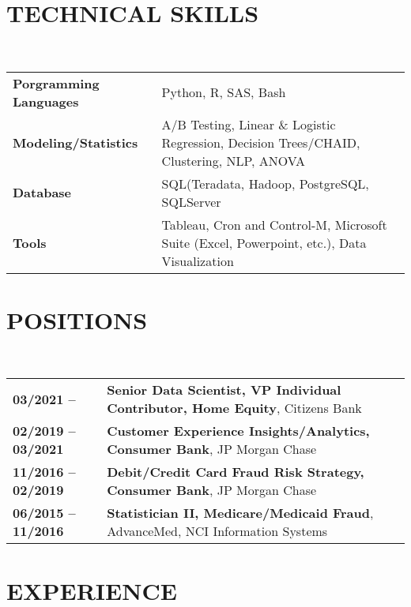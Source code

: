 \documentclass[a4paper,11pt]{article}
\begin{document}
\maketitle

\vspace{1pt}
\section{TECHNICAL SKILLS}
~\begin{tabular}{lP{15cm}}\parskip=0cm
\textbf{Porgramming Languages} & {Python, R, SAS, Bash}\\
\textbf{Modeling/Statistics} & {A/B Testing, Linear \& Logistic Regression, Decision Trees/CHAID, Clustering, NLP, ANOVA}\\
\textbf{Database} & {SQL(Teradata, Hadoop, PostgreSQL, SQLServer}\\
\textbf{Tools} & {Tableau, Cron and Control-M, Microsoft Suite (Excel, Powerpoint, etc.), Data Visualization}\\
  \end{tabular}

\section{POSITIONS}

~\begin{tabular}{lP{15cm}}
\textbf{03/2021 --}& \textbf{Senior Data Scientist, VP Individual Contributor, Home Equity},
        Citizens Bank\\
\textbf{02/2019 -- 03/2021}& \textbf{Customer Experience Insights/Analytics, Consumer Bank},
        JP Morgan Chase\\
\textbf{11/2016 -- 02/2019}& \textbf{Debit/Credit Card Fraud Risk Strategy, Consumer Bank},
        JP Morgan Chase\\
\textbf{06/2015 -- 11/2016}& \textbf{Statistician II, Medicare/Medicaid Fraud}, 
        AdvanceMed, NCI Information Systems \\
  \end{tabular}

\section{EXPERIENCE}
\end{document}
